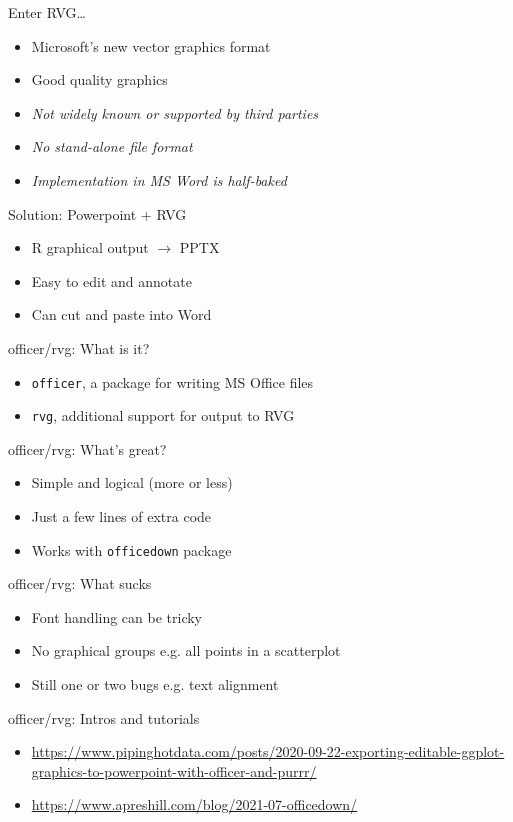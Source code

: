 \documentclass[aspectratio=169,12pt]{beamer} %
\begin{document}
\begin{frame}{Enter RVG\dots}
	\begin{itemize}
		\item Microsoft's new vector graphics format
		\item Good quality graphics
		\item \emph{Not widely known or supported by third parties}
		\item \emph{No stand-alone file format}
		\item \emph{Implementation in MS Word is half-baked}
	\end{itemize}
\end{frame}

\begin{frame}{Solution: Powerpoint + RVG}
	\begin{itemize}
		\item R graphical output $\rightarrow$ PPTX
		\item Easy to edit and annotate
		\item Can cut and paste into Word
	\end{itemize}
\end{frame}

\begin{frame}{officer/rvg: What is it?}
	\begin{itemize}
		\item \texttt{officer}, a package for writing MS Office files
		\item \texttt{rvg}, additional support for output to RVG
	\end{itemize}
\end{frame}

\begin{frame}{officer/rvg: What's great?}
	\begin{itemize}
		\item Simple and logical (more or less)
		\item Just a few lines of extra code
		\item Works with \texttt{officedown} package
	\end{itemize}
\end{frame}

\begin{frame}{officer/rvg: What sucks}
	\begin{itemize}
		\item Font handling can be tricky
		\item No graphical groups e.g. all points in a scatterplot
		\item Still one or two bugs e.g. text alignment
	\end{itemize}
\end{frame}

\begin{frame}{officer/rvg: Intros and tutorials}
	\begin{itemize}
		\item \scriptsize{\url{https://www.pipinghotdata.com/posts/2020-09-22-exporting-editable-ggplot-graphics-to-powerpoint-with-officer-and-purrr/}}
		\item \scriptsize{\url{https://www.apreshill.com/blog/2021-07-officedown/}}
	\end{itemize}
\end{frame}
\end{document}
